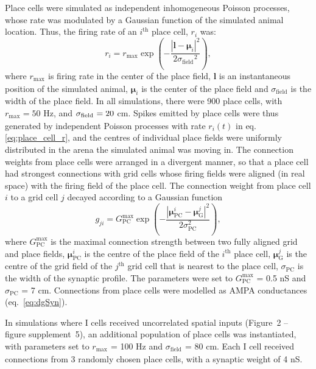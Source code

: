 \documentclass[a4paper,12pt]{article}
\newcommand{\ssc}[3]{\ensuremath{#1_{\text{#2}_{\text{#3}}}}}
\newcommand{\sigmasub}[1]{\ssc{\sigma}{\scriptsize{#1}}{}}
\begin{document}
Place cells were simulated as independent inhomogeneous Poisson processes,
whose rate was modulated by a Gaussian function of the simulated animal
location. Thus, the firing rate of an $i^{\text{th}}$ place cell, $r_i$ was:
\begin{equation}
    r_i = \ssc{r}{max}{} \exp\left(- \frac{|\mathbf{l} - \bm{\mu}_i|^2}{2
            \ssc{\sigma}{field}{}^2} \right),
    \label{eq:place_cell_r}
\end{equation}
where $\ssc{r}{max}{}$ is firing rate in the center of the place field,
$\mathbf{l}$ is an instantaneous position of the simulated animal,
$\bm{\mu}_i$ is the center of the place field and
$\ssc{\sigma}{field}{}$ is the width of the place field.
In all simulations,
there were 900 place cells, with $\ssc{r}{max}{} = 50$ Hz, and $\sigmasub{field}
= 20$ cm.  Spikes emitted by place cells were thus generated by independent
Poisson processes with rate $r_i(t)$ in eq. \eqref{eq:place_cell_r}, and the
centres of individual place fields were uniformly distributed in the arena the
simulated animal was moving in.
The connection weights from place cells were arranged in a divergent
manner, so that a place cell had strongest connections with grid cells whose
firing fields were aligned (in real space) with the firing field of the place
cell. The connection weight from place
cell $i$ to a grid cell $j$ decayed according to a Gaussian function
\begin{equation}
    g_{ji} = G_{\text{PC}}^{\text{max}} \exp\left(- \frac{|\bm{\mu}_{\text{PC}}^{i} -
    \bm{\mu}_{\text{G}}^j|^2}{2\sigma_\text{PC}^2} \right),
    \label{eq:TG_pc_diverg_conn}
\end{equation}
where $G_{\text{PC}}^{\text{max}}$ is the maximal connection strength between
two fully aligned grid and place fields, $\bm{\mu}_{\text{PC}}^{i}$ is the
centre of the place field of the $i^{\text{th}}$ place cell,
$\bm{\mu}_{\text{G}}^j$ is the centre of the grid field of the $j^{\text{th}}$
grid cell that is nearest to the place cell, $\sigma_\text{PC}$ is the width of
the synaptic profile. The parameters were set to $G_{\text{PC}}^{\text{max}}$ =
0.5 nS and $\sigma_\text{PC}$ = 7 cm. Connections from place cells were modelled
as AMPA conductances (eq.~\ref{eq:dgSyn}).

In simulations where I cells received uncorrelated spatial inputs (Figure~2 --
figure supplement~5), an additional population of place cells was
instantiated, with parameters set to \ssc{r}{max}{} = 100 Hz and
\ssc{\sigma}{field}{} = 80 cm.  Each I cell received connections from 3
randomly chosen place cells, with a synaptic weight of 4 nS.
\end{document}
